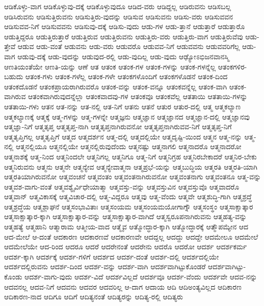 {ಆಡಿಕೊಳ್ಳು-ವಾಗ
ಆಡಿಕೊಳ್ಳುವು-ದಕ್ಕೆ
ಆಡಿಕೊಳ್ಳುವುದೂ
ಆಡಿದ-ವರು
ಆಡಿದ್ದಲ್ಲ
ಆಡಿರುವನು
ಆಡಿಸಬಲ್ಲ
ಆಡಿಸಿರುವನು
ಆಡಿಸುತ್ತಿರುವನು
ಆಡಿಸುತ್ತಿರು-ವುದನ್ನು
ಆಡಿಸುವ
ಆಡಿಸುವನು
ಆಡಿಸು-ವರು
ಆಡಿಸುವವನ
ಆಡಿಸುವವ-ನಿಗೆ
ಆಡಿಸುವವನು
ಆಡಿಸುವು-ದಕ್ಕೆ
ಆಡಿಸು-ವುದು
ಆಡು-ಗಳ
ಆಡು-ತ್ತಾನೆ
ಆಡುತ್ತಾರೆ
ಆಡುತ್ತಾರೊ
ಆಡುತ್ತಿದ್ದರೂ
ಆಡುತ್ತಿರುತ್ತಾರೆ
ಆಡುತ್ತಿರುವ
ಆಡುತ್ತಿರುವನು
ಆಡುತ್ತಿರು-ವರು
ಆಡುತ್ತಿರು-ವಾಗ
ಆಡುತ್ತಿರುವೆವು
ಆಡು-ತ್ತೇವೆ
ಆಡುವ
ಆಡು-ವಂತೆ
ಆಡುವನು
ಆಡು-ವರು
ಆಡುವರೊ
ಆಡುವವ-ನಿಗೆ
ಆಡುವವನು
ಆಡುವವರಿಗೆಲ್ಲ
ಆಡು-ವಾಗ
ಆಡುವು-ದಕ್ಕೆ
ಆಡು-ವುದನ್ನು
ಆಡುವುದ-ರಲ್ಲಿ
ಆಡು-ವುದಿಲ್ಲ
ಆಡು-ವುದು
ಆಢ್ಯೋಽಭಿಜನವಾನಸ್ಮಿ
ಆಣತಿಯಂತೆಯೇ
ಆಣತಿ-ಯನ್ನು
ಆಣೆ
ಆತ
ಆತಂಕ
ಆತಂಕ-ಗಳ
ಆತಂಕ-ಗಳನ್ನು
ಆತಂಕ-ಗಳನ್ನೆಲ್ಲ
ಆತಂಕಗಳಿರ-ಬಹುದು
ಆತಂಕ-ಗಳು
ಆತಂಕ-ಗಳೆಲ್ಲ
ಆತಂಕ-ಗಳೇ
ಆತಂಕಗಳೊಂದಿಗೆ
ಆತಂಕಗಳೊಡನೆ
ಆತಂಕ-ದಿಂದ
ಆತಂಕದೊಡನೆ
ಆತಂಕಪ್ರಾಯರಾಗಿರುವರೊ
ಆತಂಕ-ವನ್ನು
ಆತಂಕ-ವನ್ನೂ
ಆತಂಕವನ್ನೆಲ್ಲ
ಆತಂಕ-ವಾಗಿ
ಆತಂಕ-ವಾಗಿರುವ
ಆತಂಕವಾಗಿರುವುದನ್ನೆಲ್ಲಾ
ಆತಂಕವಾದವು-ಗಳ
ಆತಂಕವೂ
ಆತಂಕವೆಲ್ಲ
ಆತತಾಯಿ
ಆತತಾಯಿ-ಗಳನ್ನು
ಆತತಾಯಿ-ಗಳು
ಆತನ
ಆತ-ನನ್ನು
ಆತ-ನಲ್ಲಿ
ಆತ-ನಿಗೆ
ಆತನು
ಆತನೆ
ಆತುರ
ಆತುರ-ದಲ್ಲಿ
ಆತ್ಮ
ಆತ್ಮಕಲ್ಯಾಣ
ಆತ್ಮಕಲ್ಯಾಣಕ್ಕೆ
ಆತ್ಮಕ್ಕೆ
ಆತ್ಮ-ಗಳನ್ನು
ಆತ್ಮ-ಗಳನ್ನೇ
ಆತ್ಮಜ್ಞನು
ಆತ್ಮಜ್ಞಾನ
ಆತ್ಮಜ್ಞಾನದ
ಆತ್ಮಜ್ಞಾನ-ದಲ್ಲಿ
ಆತ್ಮಜ್ಞಾನವು
ಆತ್ಮಜ್ಞಾ-ನಿಗೆ
ಆತ್ಮತೃಪ್ತ
ಆತ್ಮತೃಪ್ತ-ನಾಗಿ
ಆತ್ಮತೃಪ್ತನಾಗಿರುವನೋ
ಆತ್ಮತೃಪ್ತನಾಗಿರುವವ-ನಿಗೆ
ಆತ್ಮತೃಪ್ತ-ನಿಗೆ
ಆತ್ಮತೃಪ್ತಿಗಲ್ಲ
ಆತ್ಮತೃಪ್ತಿಗೆ
ಆತ್ಮದ
ಆತ್ಮದರ್ಶನ
ಆತ್ಮ-ದಲ್ಲಿ
ಆತ್ಮದಲ್ಲಿಯೇ
ಆತ್ಮದೃಷ್ಟಿ-ಯಿಂದ
ಆತ್ಮನ
ಆತ್ಮ-ನನ್ನು
ಆತ್ಮ-ನಲ್ಲಿ
ಆತ್ಮನಲ್ಲಿಯೂ
ಆತ್ಮನಲ್ಲಿಯೇ
ಆತ್ಮನಲ್ಲಿರುವುದೆಂದು
ಆತ್ಮನಷ್ಟು
ಆತ್ಮನಾಗಲಿ
ಆತ್ಮನಾದರೊ
ಆತ್ಮನಾದರೋ
ಆತ್ಮನಾಶಕ್ಕೆ
ಆತ್ಮ-ನಿಂದ
ಆತ್ಮನಿಂದಲೇ
ಆತ್ಮನಿಗಲ್ಲ
ಆತ್ಮನಿಗೂ
ಆತ್ಮ-ನಿಗೆ
ಆತ್ಮನಿಗ್ರಹ
ಆತ್ಮನಿರಬೇಕಾದರೆ
ಆತ್ಮನಿರ-ಬೇಕು
ಆತ್ಮನಿರುವನು
ಆತ್ಮನು
ಆತ್ಮನೇ
ಆತ್ಮನ್ಯೇವ
ಆತ್ಮನ್ಯೇವಾತ್ಮನಾ
ಆತ್ಮಪ್ರಭೆ-ಯನ್ನು
ಆತ್ಮಬುದ್ಧಿಯ
ಆತ್ಮರತಿ
ಆತ್ಮರತಿ-ಯಾಗಿ
ಆತ್ಮರತಿಯಾಗಿರುವನೋ
ಆತ್ಮವಂಚನೆ
ಆತ್ಮವಂತಂ
ಆತ್ಮವಂತನಾಗಿರುವನೋ
ಆತ್ಮವಂತನಾಗು
ಆತ್ಮವಂತನೂ
ಆತ್ಮ-ವನ್ನು
ಆತ್ಮವಶ-ವಾಗು-ವಂತೆ
ಆತ್ಮವಶ್ಯೈರ್ವಿಧೇಯಾತ್ಮಾ
ಆತ್ಮವಸ್ತು-ವನ್ನು
ಆತ್ಮವಸ್ತುವಿನ
ಆತ್ಮವಸ್ತುವೊ
ಆತ್ಮವಾದರೊ
ಆತ್ಮವಾನ್
ಆತ್ಮವಿಕಾಸಕ್ಕೆ
ಆತ್ಮವಿಚಾರ-ದಲ್ಲಿ
ಆತ್ಮ-ವಿದ್ದರೂ
ಆತ್ಮವು
ಆತ್ಮ-ವೆಂದು
ಆತ್ಮವೇ
ಆತ್ಮಶುದ್ಧಿ-ಗಾಗಿ
ಆತ್ಮಶ್ರದ್ಧೆ
ಆತ್ಮಶ್ರದ್ಧೆಯ
ಆತ್ಮಶ್ಲಾಘನೆ
ಆತ್ಮಸಂಭಾವಿತಾಃ
ಆತ್ಮಸಂಯಮ
ಆತ್ಮಸಂಯಮಯೋಗಾಗ್ನೌ
ಆತ್ಮಸಂಸ್ಥಂ
ಆತ್ಮಸಾಕ್ಷಾತ್ಕಾರ
ಆತ್ಮಸಾಕ್ಷಾತ್ಕಾರ-ಕ್ಕಾಗಿ
ಆತ್ಮಸಾಕ್ಷಾತ್ಕಾರ-ವನ್ನು
ಆತ್ಮಸಾಕ್ಷಾತ್ಕಾರ-ವಾಗಿದೆ
ಆತ್ಮಸ್ವರೂಪನಾಗಿರುವನು
ಆತ್ಮಹತ್ಯ-ವನ್ನು
ಆತ್ಮಹತ್ಯೆ
ಆತ್ಮಹಾನಿ
ಆತ್ಮಾರಾಮ
ಆತ್ಮೀಯ-ವಾದ
ಆತ್ಮೈವ
ಆತ್ಮೋದ್ಧಾರ-ಕ್ಕಾಗಿ
ಆತ್ಮೋದ್ಧಾರಕ್ಕೆ
ಆತ್ಮೌಪಮ್ಯೇನ
ಆದ
ಆದ-ಮೇಲೆ
ಆ-ದಂತೆ
ಆದಕಾರಣ
ಆದಕಾರಣವೆ
ಆದಕಾರಣವೇ
ಆದದ್ದಲ್ಲ
ಆದದ್ದು
ಆದದ್ದೇ
ಆದಮೇಲೂ
ಆದಮೇಲೆ
ಆದಮೇಲೆಯೇ
ಆದ-ರಿಂದ
ಆದರೂ
ಆದರೆ
ಆದರೇನಂತೆ
ಆದರೇನು
ಆದರೊ
ಆದರೋ
ಆದರ್ಶ
ಆದರ್ಶಕರ್ಮ
ಆದರ್ಶ-ಕ್ಕಾಗಿ
ಆದರ್ಶಕ್ಕೆ
ಆದರ್ಶ-ಗಳಿಗೆ
ಆದರ್ಶದ
ಆದರ್ಶ-ದಂತೆ
ಆದರ್ಶ-ದಲ್ಲಿ
ಆದರ್ಶದಲ್ಲಿಯೇ
ಆದರ್ಶದಲ್ಲಿರುವನು
ಆದರ್ಶ-ದಿಂದ
ಆದರ್ಶ-ವನ್ನು
ಆದರ್ಶ-ವಾಗಿ
ಆದರ್ಶವಾಗಿಟ್ಟುಕೊಂಡರೆ
ಆದರ್ಶವಾಗಿಟ್ಟು-ಕೊಂಡು
ಆದರ್ಶ-ವಾಗು-ವುದು
ಆದರ್ಶ-ವಿದೆ
ಆದರ್ಶವಿಲ್ಲದೆ
ಆದರ್ಶವೂ
ಆದರ್ಶ-ವೆಂದು
ಆದರ್ಶವೇ
ಆದವ-ನನ್ನು
ಆದವನಲ್ಲ
ಆದವ-ನಿಗೆ
ಆದವನು
ಆದವರ
ಆದವರಿಲ್ಲ
ಆ-ದಾಗ
ಆದಾಯ
ಆದಿ
ಆದಿಅಂತ್ಯವಿಲ್ಲದ
ಆದಿಕಾರಣ
ಆದಿಕಾರಣ-ನಾದ
ಆದಿಗೂ
ಆದಿಗೆ
ಆದಿತ್ಯನಂತೆ
ಆದಿತ್ಯರನ್ನು
ಆದಿತ್ಯ-ರಲ್ಲಿ
ಆದಿತ್ಯರು
}
